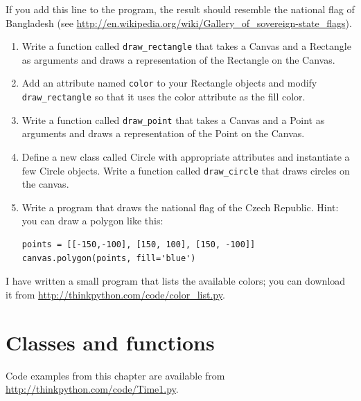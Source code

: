 \documentclass[10pt]{book}
\begin{document}
\begin{exercise}
If you add this line to the program, 
the result should resemble the national flag of Bangladesh
(see \url{http://en.wikipedia.org/wiki/Gallery_of_sovereign-state_flags}).

\begin{enumerate}

\item Write a function called \verb"draw_rectangle" that takes a
  Canvas and a Rectangle as arguments and draws a
  representation of the Rectangle on the Canvas.

\item Add an attribute named {\tt color} to your Rectangle objects and
  modify \verb"draw_rectangle" so that it uses the color attribute as
  the fill color.

\item Write a function called \verb"draw_point" that takes a
  Canvas and a Point as arguments and draws a
  representation of the Point on the Canvas.

\item Define a new class called Circle with appropriate attributes and
  instantiate a few Circle objects.  Write a function called
  \verb"draw_circle" that draws circles on the canvas.

\item Write a program that draws the national flag of the Czech Republic.
Hint: you can draw a polygon like this:

\begin{verbatim}
points = [[-150,-100], [150, 100], [150, -100]]
canvas.polygon(points, fill='blue')
\end{verbatim}

\end{enumerate}

I have written a small program that lists the available colors;
you can download it from \url{http://thinkpython.com/code/color_list.py}.

\end{exercise}


\chapter{Classes and functions}
\label{time}

Code examples from this chapter are available from
\url{http://thinkpython.com/code/Time1.py}.
\end{document}
